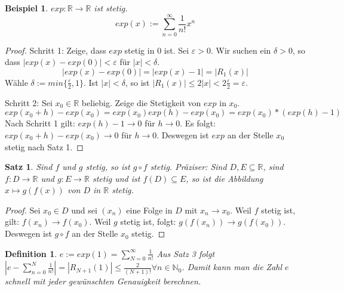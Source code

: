 \documentclass[a4paper,10pt]{article}
\newtheorem{definition}{Definition}
\newtheorem{example}{Beispiel}
\newtheorem{satz}{Satz}
\begin{document}
\begin{example}
 $exp: \mathbb{R} \rightarrow \mathbb{R}$ ist stetig.
 \begin{equation}
  exp(x) := \sum_{n = 0}^\infty \frac{1}{n!} x^n
 \end{equation}
\end{example}

\begin{proof}
 Schritt 1: Zeige, dass $exp$ stetig in $0$ ist.
 Sei $\varepsilon > 0$.
 Wir suchen ein $\delta > 0$, so dass $|exp(x) - exp(0)| < \varepsilon$ für $|x| < \delta$.
 \begin{equation}
  |exp(x) - exp(0)| = |exp(x) - 1| = |R_1(x)|
 \end{equation}
 Wähle $\delta := min \{\frac{\varepsilon}{2}, 1\}$.
 Ist $|x| < \delta$, so ist $|R_1(x)| \le 2|x| < 2\frac{\varepsilon}{2} = \varepsilon$.
 
 Schritt 2: Sei $x_0 \in \mathbb{R}$ beliebig.
 Zeige die Stetigkeit von $exp$ in $x_0$.
 \begin{equation}
  exp(x_0 + h) - exp(x_0) = exp(x_0)exp(h) - exp(x_0) = exp(x_0) * (exp(h) - 1)
 \end{equation}
 Nach Schritt 1 gilt: $exp(h) - 1 \rightarrow 0$ für $h \rightarrow 0$.
 Es folgt: $exp(x_0 + h) - exp(x_0) \rightarrow 0$ für $h \rightarrow 0$.
 Deswegen ist $exp$ an der Stelle $x_0$ stetig nach Satz 1.
\end{proof}

\begin{satz}
 Sind $f$ und $g$ stetig, so ist $g \circ f$ stetig.
 Präziser: Sind $D, E \subseteq \mathbb{R}$, sind $f: D \rightarrow \mathbb{R}$ und $g: E \rightarrow \mathbb{R}$ stetig und ist $f(D) \subseteq E$, so ist die Abbildung $x \mapsto g(f(x))$ von $D$ in $\mathbb{R}$ stetig.
\end{satz}

\begin{proof}
 Sei $x_0 \in D$ und sei $(x_n)$ eine Folge in $D$ mit $x_n \rightarrow x_0$.
 Weil $f$ stetig ist, gilt: $f(x_n) \rightarrow f(x_0)$.
 Weil $g$ stetig ist, folgt: $g(f(x_n)) \rightarrow g(f(x_0))$.
 Deswegen ist $g \circ f$ an der Stelle $x_0$ stetig.
\end{proof}

\begin{definition}
 $e := exp(1) = \sum_{N = 0}^\infty \frac{1}{n!}$
 Aus Satz 3 folgt $|e - \sum_{n = 0}^N \frac{1}{n!}| = |R_{N + 1}(1)| \le \frac{2}{(N + 1)!} \forall n \in \mathbb{N}_0$.
 Damit kann man die Zahl $e$ schnell mit jeder gewünschten Genauigkeit berechnen.
\end{definition}
\end{document}
